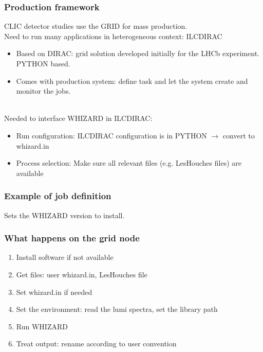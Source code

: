 \documentclass{beamer}
\newcommand{\whizard}{WHIZARD\xspace}
\begin{document}
\begin{frame}
\frametitle{Production framework}
CLIC detector studies use the {\color{blue} GRID} for mass production.\\
Need to  run many applications in heterogeneous context: \alert{ILCDIRAC}
\begin{itemize}
  \item Based on DIRAC: grid solution developed initially for the LHCb
  experiment. {\color{blue}PYTHON} based.
  \item Comes with production system: define task and let the system create
  and monitor the jobs.
\end{itemize}
~\\
Needed to interface \whizard in ILCDIRAC:
\begin{itemize}
  \item Run configuration: ILCDIRAC configuration is in PYTHON $\to$ convert to
  whizard.in
  \item Process selection: Make sure all relevant files (e.g. LesHouches files)
  are available
\end{itemize}
\end{frame}
\begin{frame}
\frametitle{Example of job definition}

Sets the \whizard version to install.
\end{frame}
\begin{frame}
\frametitle{What happens on the grid node}
\begin{enumerate}
  \item Install software if not available
  \item Get files: user whizard.in, LesHouches file
  \item Set whizard.in if needed
  \item Set the environment: read the lumi spectra, set the library path
  \item Run \whizard
  \item Treat output: rename according to user convention
\end{enumerate}
\end{frame}
\end{document}
